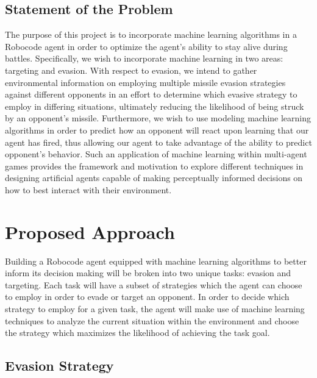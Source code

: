 \documentclass{article}
\theoremstyle{plain}
\theoremstyle{definition}
\theoremstyle{remark}
\begin{document}
\subsection*{Statement of the Problem}

The purpose of this project is to incorporate machine learning algorithms in a Robocode agent in order to optimize the agent's ability to stay alive during battles. Specifically, we wish to incorporate machine learning in two areas: targeting and evasion. With respect to evasion, we intend to gather environmental information on employing multiple missile evasion strategies against different opponents in an effort to determine which evasive strategy to employ in differing situations, ultimately reducing the likelihood of being struck by an opponent's missile.  Furthermore, we wish to use modeling machine learning algorithms in order to predict how an opponent will react upon learning that our agent has fired, thus allowing our agent to take advantage of the ability to predict opponent's behavior. Such an application of machine learning within multi-agent games provides the framework and motivation to explore different techniques in designing artificial agents capable of making perceptually informed decisions on how to best interact with their environment. 

\section{Proposed Approach}

Building a Robocode agent equipped with machine learning algorithms to better inform its decision making will be broken into two unique tasks: evasion and targeting. Each task will have a subset of strategies which the agent can choose to employ in order to evade or target an opponent. In order to decide which strategy to employ for a given task, the agent will make use of machine learning techniques to analyze the current situation within the environment and choose the strategy which maximizes the likelihood of achieving the task goal. 

\subsection*{Evasion Strategy}


\end{document}
